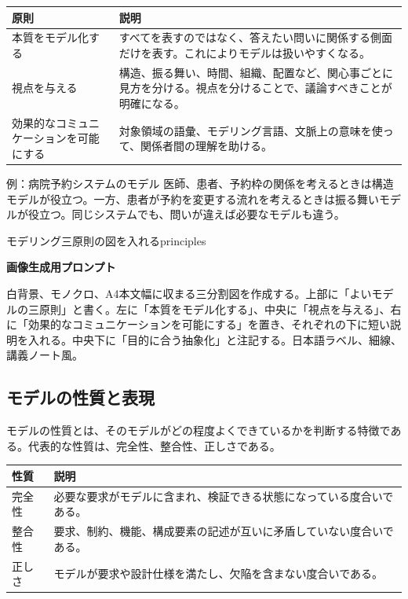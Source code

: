 \documentclass[a4paper,11pt]{ltjsarticle}
\newcommand{\prompt}[1]{\par\noindent\textbf{画像生成用プロンプト}\par\small #1\normalsize}
\begin{document}
\begin{longtable}{>{\raggedright\arraybackslash}p{}>{\raggedright\arraybackslash}p{}}
\toprule
\textbf{原則} & \textbf{説明} \\
\midrule
本質をモデル化する & すべてを表すのではなく、答えたい問いに関係する側面だけを表す。これによりモデルは扱いやすくなる。\\
視点を与える & 構造、振る舞い、時間、組織、配置など、関心事ごとに見方を分ける。視点を分けることで、議論すべきことが明確になる。\\
効果的なコミュニケーションを可能にする & 対象領域の語彙、モデリング言語、文脈上の意味を使って、関係者間の理解を助ける。\\
\bottomrule
\end{longtable}

\begin{pointbox}{例：病院予約システムのモデル}
医師、患者、予約枠の関係を考えるときは構造モデルが役立つ。一方、患者が予約を変更する流れを考えるときは振る舞いモデルが役立つ。同じシステムでも、問いが違えば必要なモデルも違う。
\end{pointbox}

\begin{todobox}{モデリング三原則の図を入れる}{principles}
\prompt{白背景、モノクロ、A4本文幅に収まる三分割図を作成する。上部に「よいモデルの三原則」と書く。左に「本質をモデル化する」、中央に「視点を与える」、右に「効果的なコミュニケーションを可能にする」を置き、それぞれの下に短い説明を入れる。中央下に「目的に合う抽象化」と注記する。日本語ラベル、細線、講義ノート風。}
\end{todobox}

\subsection{モデルの性質と表現}
モデルの性質とは、そのモデルがどの程度よくできているかを判断する特徴である。代表的な性質は、完全性、整合性、正しさである。

\begin{longtable}{>{\raggedright\arraybackslash}p{}>{\raggedright\arraybackslash}p{}}
\toprule
\textbf{性質} & \textbf{説明} \\
\midrule
完全性 & 必要な要求がモデルに含まれ、検証できる状態になっている度合いである。\\
整合性 & 要求、制約、機能、構成要素の記述が互いに矛盾していない度合いである。\\
正しさ & モデルが要求や設計仕様を満たし、欠陥を含まない度合いである。\\
\bottomrule
\end{longtable}
\end{document}
